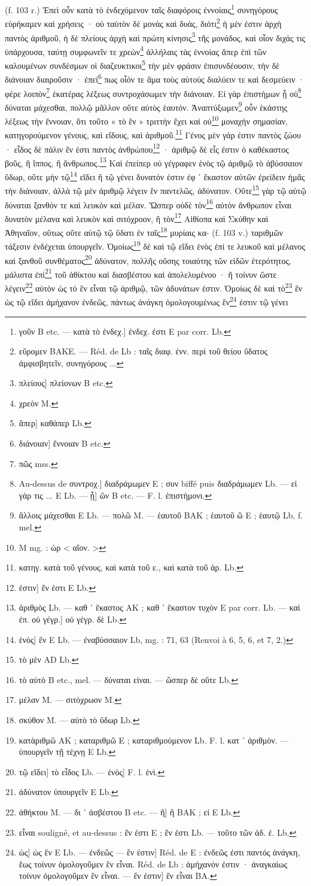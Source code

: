 \documentclass[a4paper, 11pt, oneside, polutonikogreek, french]{article}
\begin{document}
(f. 103 r.) Ἐπεὶ οὖν κατὰ τὸ ἐνδεχόμενον ταῖς διαφόροις ἐννοίαις\footnote{γοῦν B etc. --- κατὰ τὸ ἐνδεχ.] ἐνδεχ. ἐστι E par corr. Lb.} συνηγόρους εὑρήκαμεν καὶ χρήσεις · οὐ ταὐτὸν δὲ μονὰς καὶ δυὰς, διότι\footnote{εὕρομεν BAKE. --- Réd. de Lb : ταῖς διαφ. ἐνν. περὶ τοῦ θείου ὕδατος ἀμφισβητεῖν, συνηγόρους ...} ἡ μέν ἐστιν ἀρχὴ παντὸς ἀριθμοῦ, ἡ δὲ πλείους ἀρχὴ καὶ πρώτη κίνησις\footnote{πλείους] πλείονων B etc.} τῆς μονάδος, καὶ οἷον διχάς τις ὑπάρχουσα, ταύτῃ συμφωνεῖν τε χρεὼν\footnote{χρεὸν M.} ἀλλήλαις τὰς ἐννοίας ἅπερ ἐπὶ τῶν καλουμένων συνδέσμων οἱ διαζευκτικοι\footnote{ἅπερ] καθάπερ Lb.} τὴν μὲν φράσιν ἐπισυνδέουσιν, τὴν δὲ διάνοιαν διαιροῦσιν · ἐπεί\footnote{διάνοιαν] ἔννοιαν B etc.} πως οἷόν τε ἅμα τοὺς αὐτοὺς διαλύειν τε καὶ δεσμεύειν · φέρε λοιπὸν\footnote{πῶς mss.} ἑκατέρας λέξεως συντροχάσωμεν τὴν διάνοιαν. Εἰ γὰρ ἐπιστήμων ᾖ οὐ\footnote{Au-dessus de συντροχ.] διαδράμωμεν E ; συν biffé puis διαδράμωμεν Lb. --- εἰ γὰρ τις ... E Lb. --- ᾖ] ὢν B etc. --- F. l. ἐπιστήμονι.} δύναται μάχεσθαι, πολλῷ μᾶλλον οὔτε αὐτὸς ἑαυτόν. Ἀναπτύξωμεν\footnote{ἄλλοις μάχεσθαι E Lb. --- πολῶ M. --- ἑαυτοῦ BAK ; ἑαυτοῦ ῶ E ; ἑαυτῷ Lb, f. mel.} οὖν ἑκάστης λέξεως τὴν ἔννοιαν, ὅτι τοῦτο « τὸ ἓν » τριττὴν ἔχει καὶ οὐ\footnote{M mg. : ὡρ < αῖον. >} μοναχὴν σημασίαν, κατηγορούμενον γένους, καὶ εἴδους, καὶ ἀριθμοῦ.\footnote{κατηγ. κατὰ τοῦ γένους, καὶ κατὰ τοῦ ε., καὶ κατὰ τοῦ ἀρ. Lb.} Γένος μὲν γάρ ἐστιν παντὸς ζώου · εἶδος δὲ πάλιν ἕν ἐστι παντὸς ἀνθρώπου\footnote{ἐστιν] ἕν ἐστι E Lb.} · ἀριθμῷ δὲ εἷς ἐστιν ὁ καθέκαστος βοῦς, ἢ ἵππος, ἢ ἄνθρωπος.\footnote{ἀριθμὸς Lb. --- καθ ᾽ ἕκαστος AK ; καθ ᾽ ἕκαστον τυχὸν E par corr. Lb. --- καὶ ἐπ. οὐ γέγρ.] οὐ γέγρ. δὲ Lb.} Καὶ ἐπείπερ οὐ γέγραφεν ἑνὸς τῷ ἀριθμῷ τὸ ἀβύσσαιον ὕδωρ, οὔτε μὴν τῷ\footnote{ἑνὸς] ἓν E Lb. --- ἐναβύσσαιον Lb, mg. : 71, 63 (Renvoi à 6, 5, 6, et 7, 2.)} εἴδει ἢ τῷ γένει δυνατόν ἐστιν ἐφ ᾽ ἕκαστον αὐτῶν ἐρείδειν ἡμᾶς τὴν διάνοιαν, ἀλλὰ τῷ μὲν ἀριθμῷ λέγειν ἓν παντελῶς, ἀδύνατον. Οὔτε\footnote{τὸ μὲν AD Lb.} γὰρ τῷ αὐτῷ δύναται ξανθόν τε καὶ λευκὸν καὶ μέλαν. Ὥσπερ οὐδὲ τὸν\footnote{τὸ αὐτὸ B etc., mel. --- δύναται εὶναι. --- ῶσπερ δὲ οὕτε Lb.} αὐτὸν ἄνθρωπον εἶναι δυνατὸν μέλανα καὶ λευκὸν καὶ σιτόχροον, ἢ τὸν\footnote{μέλαν M. --- σιτόχρωον M.} Αἰθίοπα καὶ Σκύθην καὶ Ἀθηναῖον, οὕτως οὔτε αὐτῷ τῷ ὕδατι ἐν ταῖς\footnote{σκύθον M. --- αὐτὸ τὸ ὕδωρ Lb.} μυρίαις κα- (f. 103 v.) ταριθμῶν τάξεσιν ἐνδέχεται ὑπουργεῖν. Ὁμοίως\footnote{κατὰριθμῶ AK ; καταριθμῶ E ; καταριθμούμενον Lb. F. l. κατ ᾽ ἀριθμὸν. --- ὑπουργεῖν τῇ τέχνῃ E Lb.} δὲ καὶ τῷ εἴδει ἑνὸς ἐπί τε λευκοῦ καὶ μέλανος καὶ ξανθοῦ συνθέματος\footnote{τῷ εἴδει] τὸ εἶδος Lb. --- ἑνὸς] F. l. ἑνὶ.} ἀδύνατον, πολλῆς οὔσης τοιαύτης τῶν εἰδῶν ἑτερότητος, μάλιστα ἐπὶ\footnote{ἀδύνατον ὑπουργεῖν E Lb.} τοῦ ἀθίκτου καὶ διασβέστου καὶ ἀπολελυμένου · ῆ τοίνυν ὥστε λέγειν\footnote{ἀθήκτου M. --- δι ᾽ ἀσβέστου B etc. --- ῆ] ἢ BAK ; εἰ E Lb.} αὐτὸν ὡς τὸ ἓν εἶναι τῷ ἀριθμῷ, τῶν ἀδυνάτων ἐστιν. Ὁμοίως δὲ καὶ τὸ\footnote{εἶναι souligné, et au-dessus : ἕν ἐστι E ; ἕν ἐστι Lb. --- τοῦτο τῶν ἀδ. ἐ. Lb.} ἓν ὡς τῷ εἴδει ἀμήχανον ἐνδεῶς, πάντως ἀνάγκη ὁμολογουμένως ἕν\footnote{ὡς] ὡς ἓν E Lb. --- ἐνδεῶς --- ἕν ἐστιν] Réd. de E : ἐνδεῶς ἐστι παντός ἀνάγκη, ἕως τοίνυν ὁμολογοῦμεν ἓν εἶναι. Réd. de Lb : ἀμήχανόν ἐστιν · ἀναγκαίως τοίνυν ὁμολογοῦμεν ἓν εἶναι. --- ἕν ἐστιν] ἓν εἶναι BA.} ἐστιν τῷ γένει 
\end{document}

